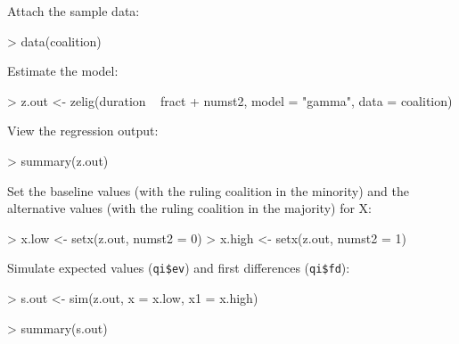 Attach the sample data: 
\begin{Schunk}
\begin{Sinput}
> data(coalition)
\end{Sinput}
\end{Schunk}
Estimate the model: 
\begin{Schunk}
\begin{Sinput}
> z.out <- zelig(duration ~ fract + numst2, model = "gamma", data = coalition)
\end{Sinput}
\end{Schunk}
View the regression output:  
\begin{Schunk}
\begin{Sinput}
> summary(z.out)
\end{Sinput}
\end{Schunk}
Set the baseline values (with the ruling coalition in the minority)
and the alternative values (with the ruling coalition in the majority)
for X:
\begin{Schunk}
\begin{Sinput}
> x.low <- setx(z.out, numst2 = 0)
> x.high <- setx(z.out, numst2 = 1)
\end{Sinput}
\end{Schunk}
Simulate expected values ({\tt qi\$ev}) and first differences ({\tt qi\$fd}):
\begin{Schunk}
\begin{Sinput}
> s.out <- sim(z.out, x = x.low, x1 = x.high)
\end{Sinput}
\end{Schunk}
\begin{Schunk}
\begin{Sinput}
> summary(s.out)
\end{Sinput}
\end{Schunk}
